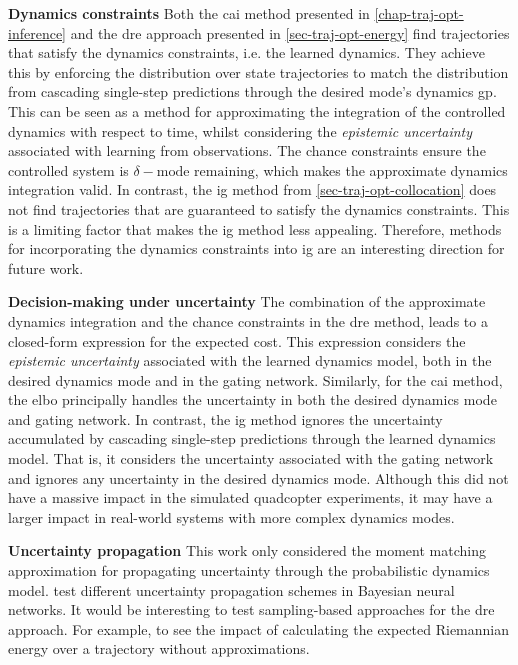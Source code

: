 \documentclass{mimosis-class/mimosis}
\numberwithin{equation}{chapter}
\begin{document}
{\textbf{Dynamics constraints}
Both the \acrshort{cai} method presented in \cref{chap-traj-opt-inference}
and the \acrshort{dre} approach presented in
\cref{sec-traj-opt-energy} find trajectories that satisfy the dynamics constraints, i.e. the learned dynamics.
They achieve this by enforcing the distribution over state trajectories
to match the distribution from cascading single-step predictions through the desired mode's dynamics \acrshort{gp}.
This can be seen as a method for approximating the integration of the controlled dynamics with respect to time, whilst
considering the \emph{epistemic uncertainty} associated with learning from observations.
The chance constraints ensure the controlled system is \(\delta-\text{mode remaining}\), which
makes the approximate dynamics integration valid.
In contrast, the \acrshort{ig} method from \cref{sec-traj-opt-collocation} does not find trajectories that are
guaranteed to satisfy the dynamics constraints.
This is a limiting factor that makes the \acrshort{ig} method less appealing.
Therefore, methods for incorporating the dynamics constraints into \acrshort{ig} are an interesting
direction for future work.


\textbf{Decision-making under uncertainty}
The combination of the approximate dynamics integration and the chance constraints
in the \acrshort{dre} method, leads to a closed-form expression for the expected cost.
This expression considers the \emph{epistemic uncertainty} associated with the learned dynamics model,
both in the desired dynamics mode and in the gating network.
Similarly, for the \acrshort{cai} method, the \acrshort{elbo} principally handles the uncertainty
in both the desired dynamics mode and gating network.
In contrast, the \acrshort{ig} method ignores the uncertainty accumulated by cascading single-step predictions through
the learned dynamics model.
That is, it considers the uncertainty associated with the gating network and ignores any uncertainty
in the desired dynamics mode.
Although this did not have a massive impact in the simulated quadcopter experiments, it may have a
larger impact in real-world systems with more complex dynamics modes.

\textbf{Uncertainty propagation}
This work only considered the moment matching approximation for propagating uncertainty through the probabilistic
dynamics model.
\cite{chuaDeep2018} test different uncertainty propagation schemes in Bayesian neural networks.
It would be interesting to test sampling-based approaches for the \acrshort{dre} approach.
For example, to see the impact of calculating the expected Riemannian energy over a trajectory without approximations.


}
\end{document}

